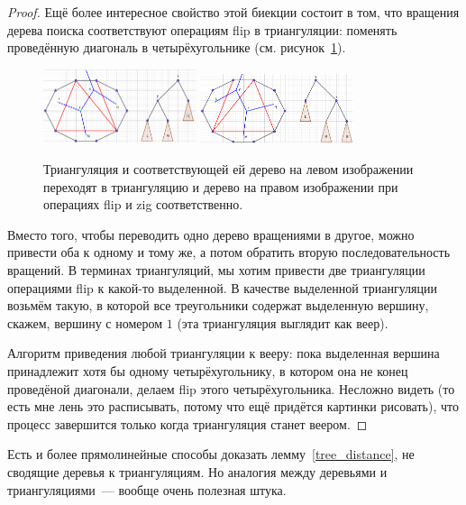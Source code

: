 \begin{proof}
	Ещё более интересное свойство этой биекции состоит в том, что вращения дерева поиска соответствуют операциям \textrm{flip} в триангуляции: поменять проведённую диагональ
	в четырёхугольнике (см. рисунок~\ref{rotate_and_flip}).
	\begin{figure}
		\includegraphics[width=0.4\textwidth]{img/before_rotation.png}
		\hspace{0.1\textwidth}
		\includegraphics[width=0.4\textwidth]{img/after_rotation.png}
		\caption{Триангуляция и соответствующей ей дерево на левом изображении
			переходят в триангуляцию и дерево на правом изображении при операциях
			\textrm{flip} и \textrm{zig} соответственно.}
		\label{rotate_and_flip}
	\end{figure}

	Вместо того, чтобы переводить одно дерево вращениями в другое, можно привести оба к одному и тому же, а потом обратить вторую последовательность вращений. В терминах триангуляций, мы хотим привести две триангуляции операциями
	\textrm{flip} к какой-то выделенной. В качестве выделенной триангуляции возьмём такую, в которой все треугольники содержат выделенную вершину, скажем, вершину с номером $1$
	(эта триангуляция выглядит как веер).

	Алгоритм приведения любой триангуляции к вееру: пока выделенная вершина принадлежит хотя бы одному четырёхугольнику, в котором она не конец проведёной диагонали, делаем \textrm{flip} этого четырёхугольника. Несложно видеть (то есть мне лень это расписывать, потому что ещё придётся картинки рисовать), что процесс завершится только когда триангуляция станет веером.
\end{proof}

\begin{remark} Есть и более прямолинейные способы доказать лемму~\ref{tree_distance}, не
	сводящие деревья к триангуляциям. Но аналогия между деревьями и триангуляциями~--- вообще очень полезная штука.
\end{remark}

